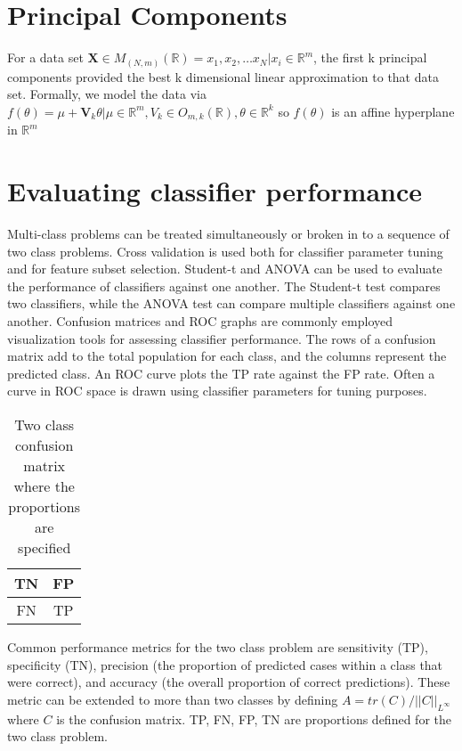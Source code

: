 \section*{Principal Components} For a data set $\textbf{X} \in
M_{(N,m)}(\mathbb{R}) = { x_1, x_2, \ldots x_N | x_i \in
\mathbb{R}^m } $, the first k principal components provided the
best k dimensional linear approximation to that data set.
Formally, we model the data via $f(\theta) = \mu + \textbf{V}_k
\theta | \mu \in \mathbb{R}^m, V_k \in O_{m,k}(\mathbb{R}),
\theta \in \mathbb{R}^k$ so $f(\theta)$ is an affine hyperplane
in $\mathbb{R}^m$


\section*{Evaluating classifier performance} Multi-class problems can be treated simultaneously or broken in to a sequence of two class problems.  Cross validation is used both for classifier parameter tuning and for feature subset selection.  Student-t and ANOVA can be used to evaluate the performance of classifiers against one another.  The Student-t test compares two classifiers, while the ANOVA test can compare multiple classifiers against one another.  Confusion matrices and ROC graphs are commonly employed visualization tools for assessing classifier performance. The rows of a confusion matrix add to the total population for each class, and the columns represent the predicted class.  An ROC curve plots the TP rate against the FP rate. Often a curve in ROC space is drawn using classifier parameters for tuning purposes.

\begin{table}[h]
\begin{tabular}{|c|c|}
  \hline
  TN &  FP \\
  \hline
  FN & TP \\
  \hline
\end{tabular}
\caption{Two class confusion matrix where the proportions are
specified}
\end{table}

Common performance metrics for the two class problem are sensitivity (TP), specificity (TN), precision (the proportion of predicted cases within a class that were correct), and accuracy (the overall proportion of correct predictions). These metric can be extended to more than two classes by defining $A=tr ( C ) / || C ||_{L^\infty}$ where $C$ is the confusion matrix. TP, FN, FP, TN are proportions defined for the two class problem.


